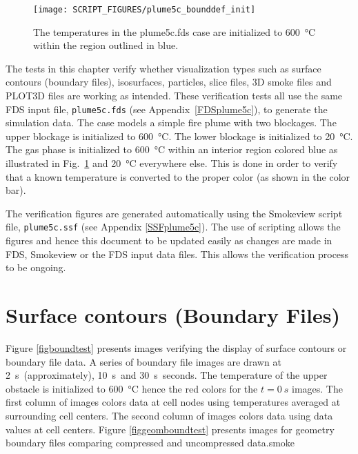 \documentclass[11pt,twoside]{book}
\begin{document}
\begin{figure}[bph]
\begin{center}
\texttt{[image: SCRIPT\_FIGURES/plume5c\_bounddef\_init]}
\end{center}
\caption{The temperatures in the plume5c.fds case are initialized to
\SI{600}{\degreeCelsius} within the region outlined in blue.}
\label{figbounddef}%
\end{figure}

The tests in this chapter verify whether visualization types such
as surface contours (boundary files), isosurfaces, particles,
slice files, 3D smoke files and PLOT3D files are working as
intended.  These verification tests all use the same FDS input
file, {\tt plume5c.fds} (see Appendix~\ref{FDSplume5c}), to
generate the simulation data.  The case models a simple fire plume
with two blockages.  The upper blockage is initialized to
\SI{600}{\degreeCelsius}.   The lower blockage is initialized to
\SI{20}{\degreeCelsius}.  The gas phase is initialized to
\SI{600}{\degreeCelsius} within an interior region colored blue as
illustrated in Fig.~\ref{figbounddef} and \SI{20}{\degreeCelsius}
everywhere else.  This is done in order to verify that a known
temperature is converted to the proper color (as shown in the
color bar).

The verification figures are generated automatically using the Smokeview
script file, {\tt plume5c.ssf} (see Appendix \ref{SSFplume5c}).  The use
of scripting allows the figures and hence this document to be updated
easily as changes are made in FDS, Smokeview or the FDS input data files.
This allows the verification process to be ongoing.

\clearpage

\section{Surface contours (Boundary Files)}
Figure \ref{figboundtest} presents images verifying the display of surface
contours or boundary file data. A series of boundary file images are drawn
at \SI{2}{s}\ (approximately), \SI{10}{s}\ and \SI{30}{s}\ seconds.
The temperature of the upper obstacle is initialized to \SI{600}{\degreeCelsius}
hence the red colors for the $t=\SI{0}{s}$ images. The first column of images
colors data at cell nodes using temperatures averaged at surrounding cell centers.
The second column of images colors data using data values at cell centers.
Figure \ref{figgeomboundtest} presents images for geometry boundary files comparing compressed and
uncompressed data.smoke
\end{document}
